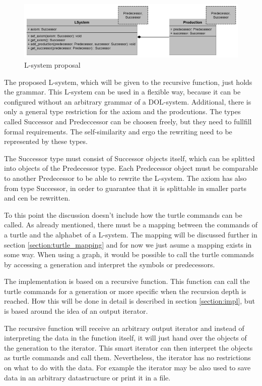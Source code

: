 \documentclass[english]{cpp-hmwk}
\begin{document}
\begin{figure}[h!]
	\centering
	\includegraphics[width=1\columnwidth]{../graphs/l_system_proposal.png}
	\caption{L-system proposal}
	\label{figure:lsystem_proposal}
\end{figure}

\medskip
\noindent The proposed L-system,  which will be given to the recursive function, just holds the grammar. This L-system can be used in a flexible way, because it can be configured without an arbitrary grammar of a DOL-system. Additional, there is only a general type restriction for the axiom and the prodcutions. The types called Successor and Predeccessor can be choosen freely, but they need to fullfill formal requirements. The self-similarity and ergo the rewriting need to be represented by these types.

The Successor type must consist of Successor objects itself, which can be splitted into objects of the Predecessor type. Each Predecessor object must be comparable to another Predecessor to be able to rewrite the L-system. The axiom has also from type Successor, in order to guarantee that it is splittable in smaller parts and cen be rewritten.
 
To this point the discussion doesn't include how the turtle commands can be called. As already mentioned, there must be a mapping between the commands of a turtle and the alphabet of a L-system. The mapping will be discussed further in section \ref{section:turtle_mapping} and for now we just asume a mapping exists in some way. When using a graph, it would be possible to call the turtle commands by accessing a generation and interpret the symbols or predecessors.

The implementation is based on a recursive function. This function can call the turtle commands for a generation or more specific when the recursion depth is reached. How this will be done in detail is described in section \ref{section:impl}, but is based around the idea of an output iterator.

The recursive function will receive an arbitrary output iterator and instead of interpreting the data in the function itself, it will just hand over the objects of the generation to the iterator. This smart iterator can then interpret the objects as turtle commands and call them. Nevertheless, the iterator has no restrictions on what to do with the data. For example the iterator may be also used to save data in an arbitrary datastructure or print it in a file.
\end{document}
